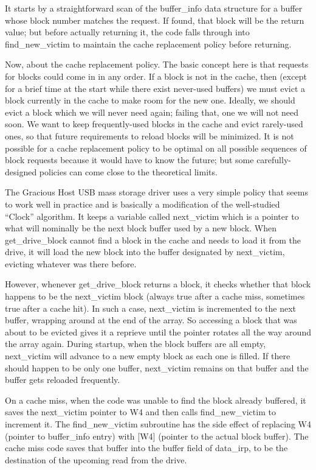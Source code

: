 It starts by a straightforward scan of the buffer\_info data structure for a
buffer whose block number matches the request.  If found, that block will be
the return value; but before actually returning it, the code falls through
into find\_new\_victim to maintain the cache replacement policy before
returning.

Now, about the cache replacement policy.  The basic concept here is that
requests for blocks could come in in any order.  If a block is not in the
cache, then (except for a brief time at the start while there exist
never-used buffers) we must evict a block currently in the cache to make
room for the new one.  Ideally, we should evict a block which we will never
need again; failing that, one we will not need soon.  We want to keep
frequently-used blocks in the cache and evict rarely-used ones, so that
future requirements to reload blocks will be minimized.
It is not possible for a cache replacement policy to be optimal on all
possible sequences of block requests because it would have to know the
future; but some carefully-designed policies can come close to the
theoretical limits.

The Gracious Host USB mass storage driver uses a very simple policy
that seems to work well in practice and is basically a modification of the
well-studied ``Clock'' algorithm.  It keeps a variable called next\_victim
which is a pointer to what will nominally be the next block buffer used by a
new block.  When get\_drive\_block cannot find a block in the cache and
needs to load it from the drive, it will load the new block into the buffer
designated by next\_victim, evicting whatever was there before.

However, whenever get\_drive\_block returns a block, it checks whether that
block happens to be the next\_victim block (always true after a cache miss,
sometimes true after a cache hit).  In such a case, next\_victim is
incremented to the next buffer, wrapping around at the end of the array.  So
accessing a block that was about to be evicted gives it a reprieve until the
pointer rotates all the way around the array again.  During startup, when
the block buffers are all empty, next\_victim will advance to a new empty
block as each one is filled.  If there should happen to be only one buffer,
next\_victim remains on that buffer and the buffer gets reloaded frequently.

On a cache miss, when the code was unable to find the block already
buffered, it saves the next\_victim pointer to W4 and then calls
find\_new\_victim to increment it.  The find\_new\_victim subroutine has the
side effect of replacing W4 (pointer to buffer\_info entry) with [W4]
(pointer to the actual block buffer).  The cache miss code saves that buffer
into the buffer field of data\_irp, to be the destination of the upcoming
read from the drive.

